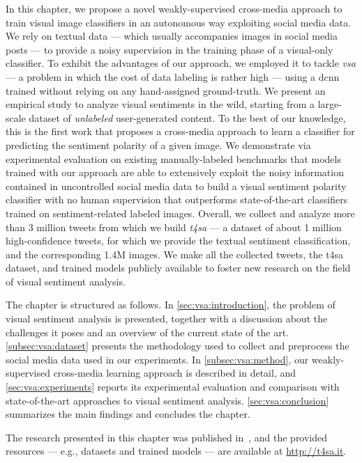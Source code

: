 In this chapter, we propose a novel weakly-supervised cross-media approach to train visual image classifiers in an autonomous way exploiting social media data.
We rely on textual data --- which usually accompanies images in social media posts --- to provide a noisy supervision in the training phase of a visual-only classifier.
To exhibit the advantages of our approach, we employed it to tackle \emph{\gls{vsa}} --- a problem in which the cost of data labeling is rather high --- using a \acrfull{dcnn} trained without relying on any hand-assigned ground-truth.
We present an empirical study to analyze visual sentiments in the wild, starting from a large-scale dataset of \emph{unlabeled} user-generated content.
To the best of our knowledge, this is the first work that proposes a cross-media approach to learn a classifier for predicting the sentiment polarity of a given image.
We demonstrate via experimental evaluation on existing manually-labeled benchmarks that models trained with our approach are able to extensively exploit the noisy information contained in uncontrolled social media data to build a visual sentiment polarity classifier with no human supervision that outperforms state-of-the-art classifiers trained on sentiment-related labeled images.
Overall, we collect and analyze more than 3 million tweets from which we build \emph{\acrfull{t4sa}} --- a dataset of about 1 million high-confidence tweets, for which we provide the textual sentiment classification, and the corresponding 1.4M images.
We make all the collected tweets, the \gls{t4sa} dataset, and trained models publicly available to foster new research on the field of visual sentiment analysis.

The chapter is structured as follows.
In \ref{sec:vsa:introduction}, the problem of visual sentiment analysis is presented, together with a discussion about the challenges it poses and an overview of the current state of the art.
\ref{subsec:vsa:dataset} presents the methodology used to collect and preprocess the social media data used in our experiments.
In \ref{subsec:vsa:method}, our weakly-supervised cross-media learning approach is described in detail, and \ref{sec:vsa:experiments} reports its experimental evaluation and comparison with state-of-the-art approaches to visual sentiment analysis.
\ref{sec:vsa:conclusion} summarizes the main findings and concludes the chapter.

The research presented in this chapter was published in~\cite{vadicamo2017cross}, and the provided resources --- e.g., datasets and trained models --- are available at \url{http://t4sa.it}.


